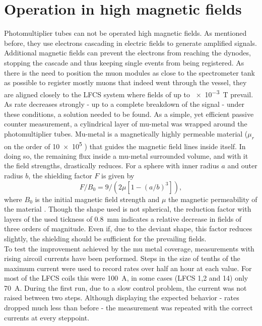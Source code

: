   \section{Operation in high magnetic fields}
  \label{ch:Analysis:sec:Modules in high magnetic fields}
  Photomultiplier tubes can not be operated high magnetic fields. As mentioned before, they use electrons cascading in electric fields to generate amplified signals. Additional magnetic fields can prevent the electrons from reaching the dynodes, stopping the cascade and thus keeping single events from being registered. 
  As there is the need to position the muon modules as close to the spectrometer tank as possible to register mostly muons that indeed went through the vessel, they are aligned closely to the LFCS system where fields of up to \SI{e-3}{\tesla} prevail. As rate decreases strongly - up to a complete breakdown of the signal\cite{nancy} - under these conditions, a solution needed to be found. As a simple, yet efficient passive counter measurement, a cylindrical layer of mu-metal was wrapped around the photomultiplier tubes. Mu-metal is a magnetically highly permeable material ($\mu_r$ on the order of \SI{10e5}{} \cite{permeability}) that guides the magnetic field lines inside itself. In doing so, the remaining flux inside a mu-metal surrounded volume, and with it the field strengths, drastically reduces.
  For a sphere with inner radius $a$ and outer radius $b$, the shielding factor $ F$ is given by
  \begin{equation}
  	F/B_0 = 9/\left(2\mu\left[1-(a/b)^3\right]\right),
  \end{equation}
  where $B_0$ is the initial magnetic field strength and $\mu$ the magnetic permeability of the material \cite{shielding}. Though the shape used is not spherical, the reduction factor with layers of the used tickness of \SI{0.8}{\mm} indicates a relative decrease in fields of three orders of magnitude. Even if, due to the deviant shape, this factor reduces slightly, the shielding should be sufficient for the prevailing fields.\\
  To test the improvement achieved by the mu metal coverage, measurements with rising aircoil currents have been performed.
  Steps in the size of tenths of the maximum current were used to record rates over half an hour at each value. For most of the LFCS coils this were \SI{100}{\ampere}, in some cases (LFCS 1,2 and 14) only \SI{70}{\ampere}.
  During the first run, due to a slow control problem, the current was not raised between two steps. Although displaying the expected behavior - rates dropped much less than before - the measurement was repeated with the correct currents at every steppoint.
